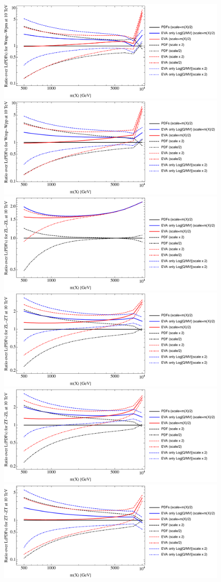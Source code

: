 \documentclass[a4paper,11pt]{article}
\begin{document}
\begin{figure}[ht]
\includegraphics[width=0.46\linewidth]{Notebooks/PlotLumi/10TeV/ratios/Wmp-Wpm.pdf}
\includegraphics[width=0.46\linewidth]{Notebooks/PlotLumi/10TeV/ratios/Wmp-Wpp.pdf}
\includegraphics[width=0.46\linewidth]{Notebooks/PlotLumi/10TeV/ratios/ZL-ZL.pdf}
\includegraphics[width=0.46\linewidth]{Notebooks/PlotLumi/10TeV/ratios/ZL-ZT.pdf}
\includegraphics[width=0.46\linewidth]{Notebooks/PlotLumi/10TeV/ratios/ZT-ZL.pdf}
\includegraphics[width=0.46\linewidth]{Notebooks/PlotLumi/10TeV/ratios/ZT-ZT.pdf}
\end{figure}
\end{document}
